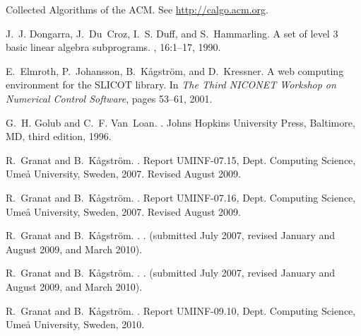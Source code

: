 \documentclass[11pt]{article}
\begin{document}
{\begin{thebibliography}{10}
{Collected Algorithms of the ACM}.
\newblock See \url{http://calgo.acm.org}.

J.~J. Dongarra, J.~Du~Croz, I.~S. Duff, and S.~Hammarling.
\newblock A set of level 3 basic linear algebra subprograms.
, 16:1--17, 1990.

E.~Elmroth, P.~Johansson, B.~K\r{a}gstr\"{o}m, and D.~Kressner.
\newblock A web computing environment for the {SLICOT} library.
\newblock In {\em The Third NICONET Workshop on Numerical Control Software},
  pages 53--61, 2001.

G.~H. Golub and C.~F. Van~Loan.
.
\newblock Johns Hopkins University Press, Baltimore, MD, third edition, 1996.

R.~Granat and B.~K{\aa}gstr{\"{o}}m.
.
\newblock Report {UMINF}-07.15, Dept. Computing Science, Ume{\aa} University,
  Sweden, 2007.
\newblock Revised August 2009.

R.~Granat and B.~K{\aa}gstr{\"{o}}m.
.
\newblock Report {UMINF}-07.16, Dept. Computing Science, Ume{\aa} University,
  Sweden, 2007.
\newblock Revised August 2009.

R.~Granat and B.~K{\aa}gstr{\"{o}}m.
.
.
 (submitted July
  2007, revised January and August 2009, and March 2010).

R.~Granat and B.~K{\aa}gstr{\"{o}}m.
.
.
 (submitted July
  2007, revised January and August 2009, and March 2010).

R.~Granat and B.~K{\aa}gstr{\"{o}}m.
.
\newblock Report {UMINF}-09.10, Dept. Computing Science, Ume{\aa} University,
  Sweden, 2010.


\end{thebibliography}}
\end{document}
